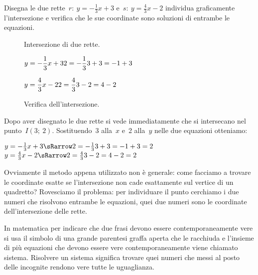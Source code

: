 \begin{exrig}
 \begin{esempio}
  Disegna le due rette~\(r:~y = -\frac{1}{3} x +3\) e~\(s:~y = \frac{4}{3} x -2\) 
  individua graficamente l'intersezione e verifica che 
  le sue coordinate sono soluzioni di entrambe le equazioni.
\begin{inaccessibleblock}
 \begin{figure}[h]
 \centering
 \begin{minipage}[]{.60\textwidth}
   \centering
  \caption{Intersezione di due rette.}\label{fig:intersezione01}
 \end{minipage}
 \begin{minipage}[]{.30\textwidth}
  \begin{center}

   \(y = -\dfrac{1}{3} x +3 \newline
    2 = -\dfrac{1}{3} 3 +3 = -1 + 3\)
   
   \(y = \dfrac{4}{3} x -2 \newline
    2 = \dfrac{4}{3} 3 -2 = 4 -2\)

  \end{center}
  \caption{Verifica dell'intersezione.}\label{fig:elementi}
 \end{minipage}
\end{figure}
\end{inaccessibleblock}
 \end{esempio}
 
\vspace{-12pt}

Dopo aver disegnato le due rette si vede immediatamente che si intersecano 
nel punto~\(I(3;~2)\). Sostituendo~3 alla~\(x\) e~2 
alla~\(y\) nelle due equazioni otteniamo:

\(y = -\frac{1}{3} x +3 \sRarrow
2 = -\frac{1}{3} 3 +3 = -1 + 3 = 2\)
\qquad
\(y = \frac{4}{3} x -2 \sRarrow
2 = \frac{4}{3} 3 -2 = 4 -2 = 2\)
   
Ovviamente il metodo appena utilizzato non è generale: come facciamo a trovare 
le coordinate esatte se l'intersezione non cade esattamente sul vertice di  
un quadretto? Rovesciamo il problema: per individuare il punto 
cerchiamo i due numeri che risolvono entrambe le equazioni, quei due numeri
sono le coordinate dell'intersezione delle rette.

In matematica per indicare che due frasi devono essere contemporaneamente 
vere si usa il simbolo di una grande parentesi graffa aperta che le racchiuda 
e l'insieme di più equazioni che devono essere vere contemporaneamente viene
chiamato sistema. Risolvere un sistema significa trovare quei numeri che 
messi al posto delle incognite rendono vere tutte le uguaglianza.


\end{exrig}
